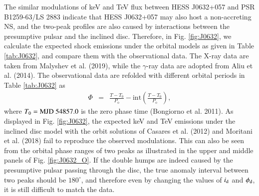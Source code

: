 \documentclass{aa}
\def\PSRB1259{PSR B1259-63/LS 2883}
\def\HESSJ0632{HESS J0632+057}
\begin{document}
The similar modulations of keV and TeV flux between \HESSJ0632 and
\PSRB1259 indicate that \HESSJ0632 may also host a non-accreting NS, and the two-peak profiles are also caused by interactions between the presumptive pulsar and the inclined disc.
Therefore, in Fig. \ref{fig:J0632}, we calculate the expected shock emissions under the orbital models as given in Table \ref{tab:J0632}, and compare them with the observational data.
The X-ray data are taken from Malyshev et al. (2019), while the $\gamma$-ray data are adopted from Aliu et al. (2014). The observational data are refolded with different orbital periods in Table \ref{tab:J0632} as
\begin{eqnarray}\label{phase}
  \Phi &=&\frac{T-T_0}{P_{\mathrm{o}}}-\mathrm{int}
  \left( \frac{T-T_0}{P_{\mathrm{o}}} \right),
\end{eqnarray}
where $T_0= {\rm MJD}\ 54857.0$ is the zero phase time (Bongiorno et al. 2011).
As displayed in Fig. \ref{fig:J0632}, the expected keV and TeV emissions under the inclined disc model with the orbit solutions of Casares et al. (2012) and Moritani et al. (2018) fail to reproduce the observed modulations.
This can also be seen from the orbital phase ranges of two peaks as illustrated in the upper and middle panels of Fig. \ref{fig:J0632_O}. If the double humps are indeed caused by the presumptive pulsar passing through the disc, the true anomaly interval between two peaks should be $180^{\circ}$, and therefore even by changing the values of $i_{\rm d}$ and $\phi_{\rm d}$, it is still difficult to match the data.
\end{document}
